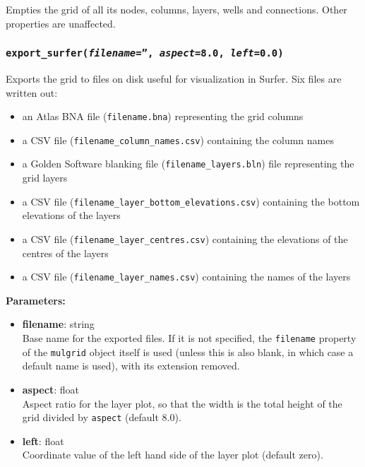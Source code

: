 Empties the grid of all its nodes, columns, layers, wells and connections.  Other properties are unaffected.

\begin{snugshade}\subsubsection{\texttt{export\_surfer(\emph{filename}='', \emph{aspect}=8.0, \emph{left}=0.0)}}\end{snugshade}
\label{sec:mulgrid:export_surfer}

Exports the grid to files on disk useful for visualization in Surfer.  Six files are written out:

\begin{itemize}
\item an Atlas BNA file (\texttt{filename.bna}) representing the grid columns
\item a CSV file (\texttt{filename\_column\_names.csv}) containing the column names
\item a Golden Software blanking file (\texttt{filename\_layers.bln}) file representing the grid layers
\item a CSV file (\texttt{filename\_layer\_bottom\_elevations.csv}) containing the bottom elevations of the layers
\item a CSV file (\texttt{filename\_layer\_centres.csv}) containing the elevations of the centres of the layers
\item a CSV file (\texttt{filename\_layer\_names.csv}) containing the names of the layers
\end{itemize}

\textbf{Parameters:}
\begin{itemize}
\item \textbf{filename}: string\\
  Base name for the exported files.  If it is not specified, the \texttt{filename} property of the \texttt{mulgrid} object itself is used (unless this is also blank, in which case a default name is used), with its extension removed.
\item \textbf{aspect}: float\\
  Aspect ratio for the layer plot, so that the width is the total height of the grid divided by \texttt{aspect} (default 8.0).
\item \textbf{left}: float\\
  Coordinate value of the left hand side of the layer plot (default zero).
\end{itemize}


